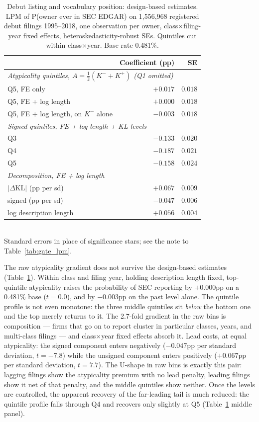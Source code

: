 \begin{table}[h]\centering\small
\caption{Debut listing and vocabulary position: design-based estimates.
LPM of P(owner ever in SEC EDGAR) on 1{,}556{,}968 registered debut
filings 1995--2018, one observation per owner, class$\times$filing-year
fixed effects, heteroskedasticity-robust SEs. Quintiles cut within
class$\times$year. Base rate 0.481\%.}
\label{tab:edgar}
\begin{tabular}{lrr}
\toprule
 & Coefficient (pp) & SE \\
\midrule
\multicolumn{3}{l}{\emph{Atypicality quintiles, $A = \tfrac{1}{2}(K^{-}+K^{+})$ (Q1 omitted)}} \\
\quad Q5, FE only & $+0.017$ & $0.018$ \\
\quad Q5, FE + log length & $+0.000$ & $0.018$ \\
\quad Q5, FE + log length, on $K^{-}$ alone & $-0.003$ & $0.018$ \\
\midrule
\multicolumn{3}{l}{\emph{Signed \dkl{} quintiles, FE + log length + KL levels}} \\
\quad Q3 & $-0.133$ & $0.020$ \\
\quad Q4 & $-0.187$ & $0.021$ \\
\quad Q5 & $-0.158$ & $0.024$ \\
\midrule
\multicolumn{3}{l}{\emph{Decomposition, FE + log length}} \\
\quad $|\Delta\mathrm{KL}|$ (pp per sd) & $+0.067$ & $0.009$ \\
\quad signed \dkl{} (pp per sd) & $-0.047$ & $0.006$ \\
\quad log description length & $+0.056$ & $0.004$ \\
\bottomrule
\end{tabular}
\\[0.3em]\footnotesize Standard errors in place of significance stars; see the
note to Table~\ref{tab:gate_lpm}.
\end{table}

The raw atypicality gradient does not survive the design-based estimates (Table~\ref{tab:edgar}). Within class and filing year, holding description length
fixed, top-quintile atypicality raises the probability of SEC reporting by
$+0.000$pp on a 0.481\% base ($t = 0.0$), and by $-0.003$pp on the past
level alone. The quintile profile is not even monotone: the three middle
quintiles sit \emph{below} the bottom one and the top merely returns to it.
The 2.7-fold gradient in the raw bins is composition --- firms that go on to
report cluster in particular classes, years, and multi-class filings --- and
class$\times$year fixed effects absorb it. Lead costs, at equal
atypicality: the signed component enters negatively
($-0.047$pp per standard deviation, $t = -7.8$) while the unsigned component enters
positively ($+0.067$pp per standard deviation, $t = 7.7$). The U-shape in raw bins
is exactly this pair: lagging filings show the atypicality premium with no
lead penalty, leading filings show it net of that penalty, and the middle
quintiles show neither. Once the levels are controlled,
the apparent recovery of the far-leading tail is much reduced: the quintile
profile falls through Q4 and recovers only slightly at Q5
(Table~\ref{tab:edgar} middle panel).

